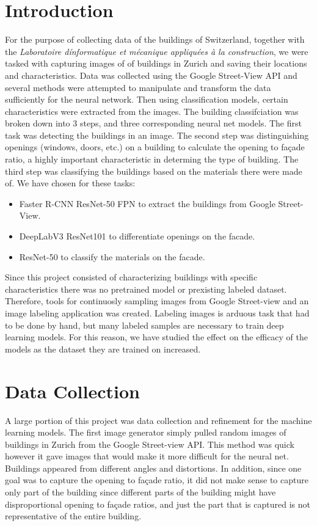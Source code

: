 \documentclass[10pt,conference,compsocconf]{IEEEtran}
\begin{document}
\section{Introduction}
For the purpose of collecting data of the buildings of Switzerland, together with the \textit{Laboratoire dínformatique et mécanique appliquées à la construction}, we were tasked with capturing images of of buildings in Zurich and saving their locations and characteristics. Data was collected using the Google Street-View API and several methods were attempted to manipulate and transform the data sufficiently for the neural network. Then using classification models, certain characteristics were extracted from the images. The building classifciation was broken down into 3 steps, and three corresponding neural net models. The first task was detecting the buildings in an image. The second step was distinguishing openings (windows, doors, etc.) on a building to calculate the opening to façade ratio, a highly important characteristic in determing the type of building. The third step was classifying the buildings based on the materials there were made of.  We have chosen for these tasks:
\begin{itemize}
    \item Faster R-CNN ResNet-50 FPN \cite{DUMMY:1} to extract the buildings from Google Street-View.
    \item DeepLabV3 ResNet101 \cite{DUMMY:1} to differentiate openings on the facade.
    \item ResNet-50 \cite{DUMMY:1} to classify the materials on the facade.
\end{itemize}
Since this project consisted of characterizing buildings with specific characteristics there was no pretrained model or prexisting labeled dataset. Therefore, tools for continuosly sampling images from Google Street-view and an image labeling application was created. Labeling images is arduous task that had to be done by hand, but many labeled samples are necessary to train deep learning models. For this reason, we have studied the effect on the efficacy of the models as the dataset they are trained on increased.

\section {Data Collection}
A large portion of this project was data collection and refinement for the machine learning models. The first image generator simply pulled random images of buildings in Zurich from the Google Street-view API. This method was quick however it gave images that would make it more difficult for the neural net. Buildings appeared from different angles and distortions. In addition, since one goal was to capture the opening to façade ratio, it did not make sense to capture only part of the building since different parts of the building might have disproportional opening to façade ratios, and just the part that is captured is not representative of the entire building. 
\end{document}
